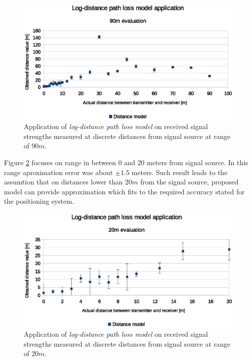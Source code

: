 \documentclass[../main.tex]{subfiles}
\begin{document}
\begin{figure}[!htbp]
\includegraphics[width=\textwidth, keepaspectratio]{pictures/tests_case1_distance_model_90m}
\centering
\caption{Application of \textit{log-distance path loss model} on received signal strengths measured at discrete distances from signal source at range of $90m$.}
\label{fig:tests_case1_distance_model_90m}
\end{figure}


Figure \ref{fig:tests_case1_distance_model_20m} focuses on range in between $0$ and $20$ meters from signal source. In this range aproximation error was about $\pm 1.5$ meters. Such result leads to the assumtion that on distances lower than $20m$ from the signal source, proposed model can provide approximation which fits to the required accuracy stated for the positioning system.

\begin{figure}[!htbp]
\includegraphics[width=\textwidth, keepaspectratio]{pictures/tests_case1_distance_model_20m}
\centering
\caption{Application of \textit{log-distance path loss model} on received signal strengths measured at discrete distances from signal source at range of $20m$.}
\label{fig:tests_case1_distance_model_20m}
\end{figure}
\end{document}

